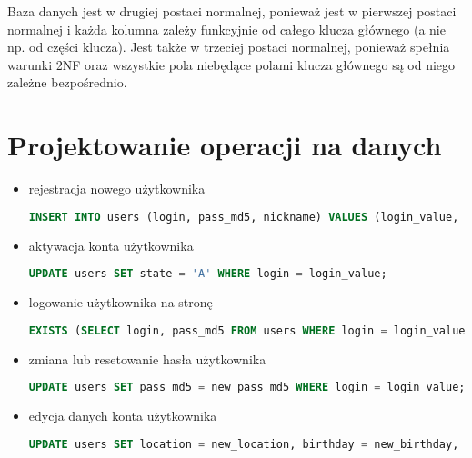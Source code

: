 \hspace{15pt}Baza danych jest w drugiej postaci normalnej, ponieważ jest w pierwszej postaci normalnej i każda kolumna zależy funkcyjnie od całego klucza głównego (a nie np. od części klucza). Jest także w trzeciej postaci normalnej, ponieważ spełnia warunki 2NF oraz wszystkie pola niebędące polami klucza głównego są od niego zależne bezpośrednio.


\clearpage
\section{Projektowanie operacji na danych}
\label{sec:operacje}

\begin{itemize}
\item rejestracja nowego użytkownika
\begin{lstlisting}[language=SQL]
INSERT INTO users (login, pass_md5, nickname) VALUES (login_value, pass_md5_value, nickname_value);
\end{lstlisting}

\item aktywacja konta użytkownika
\begin{lstlisting}[language=SQL]
UPDATE users SET state = 'A' WHERE login = login_value;
\end{lstlisting}

\item logowanie użytkownika na stronę
\begin{lstlisting}[language=SQL]
EXISTS (SELECT login, pass_md5 FROM users WHERE login = login_value AND pass_md5 = pass_md5_value);
\end{lstlisting}

\item zmiana lub resetowanie hasła użytkownika
\begin{lstlisting}[language=SQL]
UPDATE users SET pass_md5 = new_pass_md5 WHERE login = login_value;
\end{lstlisting}

\item edycja danych konta użytkownika
\begin{lstlisting}[language=SQL]
UPDATE users SET location = new_location, birthday = new_birthday, homepage = new_homapage, show_chars = tru_fal_value1, show_scenarios = tru_fal_value2, comment_notify = tru_fal_value3, session_notify = tru_fal_value4, message_notify = tru_fal_value5 WHERE login = login_value;
\end{lstlisting}


\end{itemize}
